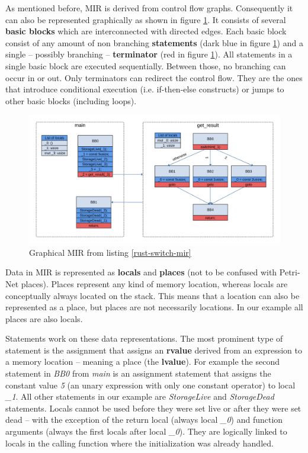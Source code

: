 As mentioned before, MIR is derived from control flow graphs\cite[chapter 2.17]{rustc-guide}.
Consequently it can also be represented graphically as shown in figure \ref{switch-mir-graph}.
It consists of several \textbf{basic blocks} which are interconnected with directed edges.
Each basic block consist of any amount of non branching \textbf{statements} (dark blue in figure \ref{switch-mir-graph}) and a single -- possibly branching -- \textbf{terminator} (red in figure \ref{switch-mir-graph}).
All statements in a single basic block are executed sequentially.
Between those, no branching can occur in or out.
Only terminators can redirect the control flow.
They are the ones that introduce conditional execution (i.e. if-then-else constructs) or jumps to other basic blocks (including loops).

\begin{figure}
    \centering
    \includegraphics[width=\textwidth]{../diagrams/SwitchInt.png}
    \caption{
        Graphical MIR from listing \ref{rust-switch-mir}
        }
    \label{switch-mir-graph}
\end{figure}

Data in MIR is represented as \textbf{locals} and \textbf{places} (not to be confused with Petri-Net places).
Places represent any kind of memory location, whereas locals are conceptually always located on the stack.
This means that a location can also be represented as a place, but places are not necessarily locations.
In our example all places are also locals.

Statements work on these data representations.
The most prominent type of statement is the assignment that assigns an \textbf{rvalue} derived from an expression to a memory location -- meaning a place (the \textbf{lvalue}).
For example the second statement in \textit{BB0} from \textit{main} is an assignment statement that assigns the constant value \textit{5} (an unary expression with only one constant operator) to local \textit{\_1}.
All other statements in our example are \textit{StorageLive} and \textit{StorageDead} statements.
Locals cannot be used before they were set live or after they were set dead -- with the exception of the return local (always local \textit{\_0}) and function arguments (always the first locals after local \textit{\_0}).
They are logically linked to locals in the calling function where the initialization was already handled.

